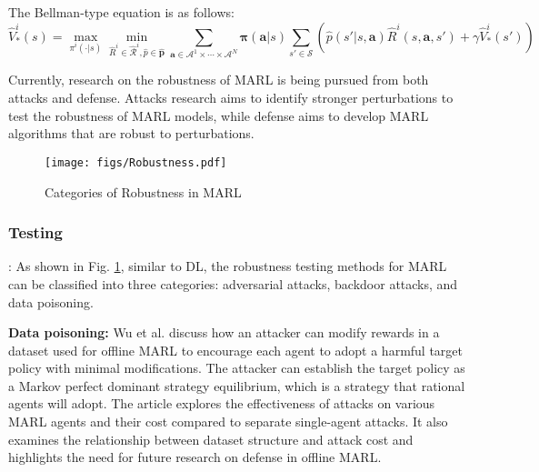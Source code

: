\documentclass[acmsmall]{acmart}
\begin{document}
The Bellman-type equation is as follows:
\begin{equation}
    \hat V^i_*\left(s\right) = \mathop {max} \limits_{\pi^i\left(\cdot|s\right)} \mathop {min} \limits_{\hat R^i \in \hat{\mathcal {R}}^i, \hat p \in \hat{\bm p}} \sum_{\bm a\in \mathcal A^1\times\cdots\times\mathcal A^N}\bm \pi\left(\bm a|s\right)\sum_{s'\in \mathcal S}\left(\hat p \left(s'|s,\bm a\right)  \hat R^i\left(s, \bm a, s'\right) + \gamma \hat V^i_*\left(s'\right) \right)
\end{equation}

Currently, research on the robustness of MARL is being pursued from both attacks and defense. Attacks research aims to identify stronger perturbations to test the robustness of MARL models, while defense aims to develop MARL algorithms that are robust to perturbations. 
\begin{figure}
    \centering
    \texttt{[image: figs/Robustness.pdf]}
    \caption{Categories of Robustness in MARL}
    \label{Robustness}
\end{figure}

\subsubsection{Testing}: 
As shown in Fig. \ref{Robustness}, similar to DL, the robustness testing methods for MARL can be classified into three categories: adversarial attacks, backdoor attacks, and data poisoning.

\textbf{Data poisoning:} Wu et al. \cite{wu2022reward} discuss how an attacker can modify rewards in a dataset used for offline MARL to encourage each agent to adopt a harmful target policy with minimal modifications. 
The attacker can establish the target policy as a Markov perfect dominant strategy equilibrium, which is a strategy that rational agents will adopt.
The article explores the effectiveness of attacks on various MARL agents and their cost compared to separate single-agent attacks. It also examines the relationship between dataset structure and attack cost and highlights the need for future research on defense in offline MARL.
\end{document}
